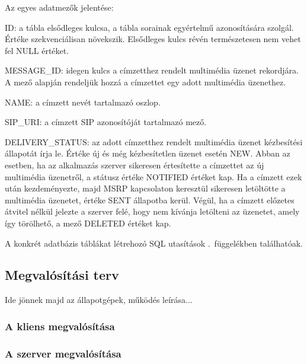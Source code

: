 Az egyes adatmezők jelentése:
\begin{mydescription}
\item[ID:] a tábla elsődleges kulcsa, a tábla sorainak egyértelmű azonosítására szolgál. Értéke szekvenciálisan növekszik. Elsődleges kulcs révén természetesen nem vehet fel NULL értéket.
\item[MESSAGE\_ID:] idegen kulcs a címzetthez rendelt multimédia üzenet rekordjára. A mező alapján rendeljük hozzá a címzettet egy adott multimédia üzenethez.
\item[NAME:]  a címzett nevét tartalmazó oszlop.
\item[SIP\_URI:] a címzett SIP azonosítóját tartalmazó mező.
\item[DELIVERY\_STATUS:] az adott címzetthez rendelt multimédia üzenet kézbesítési állapotát írja le. Értéke új és még kézbesítetlen üzenet esetén NEW. Abban az esetben, ha az alkalmazás szerver sikeresen értesítette a címzettet az új multimédia üzenetről, a státusz értéke NOTIFIED értéket kap. Ha a címzett ezek után kezdeményezte, majd MSRP kapcsolaton keresztül sikeresen letöltötte a multimédia üzenetet, értéke SENT állapotba kerül. Végül, ha a címzett előzetes átvitel nélkül jelezte a szerver felé, hogy nem kívánja letölteni az üzenetet, amely így törölhető, a mező DELETED értéket kap.
\end{mydescription}

A konkrét adatbázis táblákat létrehozó SQL utasítások .~függelékben találhatóak.
\medskip

\subsection{Megvalósítási terv}
\label{sec:megvalositas}

Ide jönnek majd az állapotgépek, működés leírása...

\subsubsection{A kliens megvalósítása}
\label{sec:kliensmegvalositas}

\subsubsection{A szerver megvalósítása}
\label{sec:szervermegvalositas}


